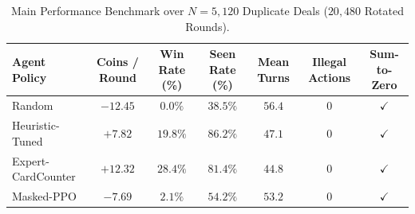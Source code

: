 \begin{table}[t]
\centering
\caption{Main Performance Benchmark over $N = 5,120$ Duplicate Deals ($20,480$ Rotated Rounds).}
\label{tab:main_benchmark}
\small
\begin{tabular}{lcccccc}
\toprule
\textbf{Agent Policy} & \textbf{Coins / Round} & \textbf{Win Rate (\%)} & \textbf{Seen Rate (\%)} & \textbf{Mean Turns} & \textbf{Illegal Actions} & \textbf{Sum-to-Zero} \\
\midrule
Random                 & $-12.45$ & $0.0\%$ & $38.5\%$ & $56.4$ & $0$ & $\checkmark$ \\
Heuristic-Tuned        & $+7.82$ & $19.8\%$ & $86.2\%$ & $47.1$ & $0$ & $\checkmark$ \\
Expert-CardCounter     & $+12.32$ & $28.4\%$ & $81.4\%$ & $44.8$ & $0$ & $\checkmark$ \\
Masked-PPO             & $-7.69$ & $2.1\%$ & $54.2\%$ & $53.2$ & $0$ & $\checkmark$ \\
\bottomrule
\end{tabular}
\end{table}
